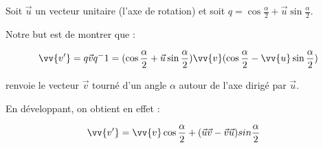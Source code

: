 Soit $\vec{u}$ un vecteur unitaire (l'axe de rotation) et soit 
$q = \cos \frac{\alpha}{2} + \vec{u} \sin \frac{\alpha}{2}$.

Notre but est de montrer que :

\[
	\vv{v'} = q\vec{v}q^-1 = ( \cos \frac{\alpha}{2} + 
	\vec{u} \sin \frac{\alpha}{2} ) \vv{v} ( \cos 
	\frac{\alpha}{2} - \vv{u} \sin \frac{\alpha}{2} )
\]

renvoie le vecteur $\vec{v}$ tourné d'un angle $\alpha$ autour de l'axe
dirigé par $\vec{u}$.

En développant, on obtient en effet :

\begin{align}
	\vv{v'} &= \vv{v} \cosad + ( \vec{u} \vec{v} - \vec{v}\vec{u} ) sin \frac{\alpha}{2}
\end{align}